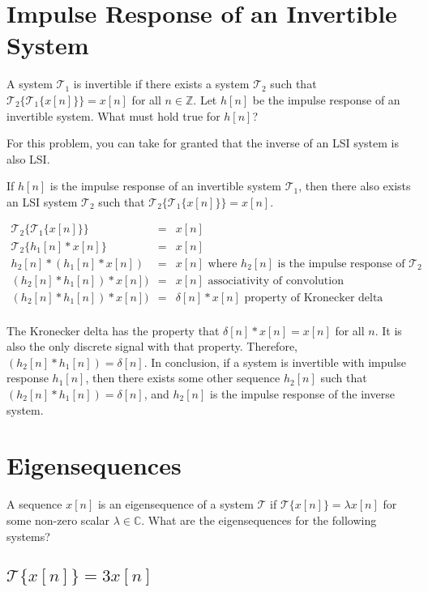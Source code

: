 \documentclass[11pt]{article}
\begin{document}
\section{Impulse Response of an Invertible System}
A system $\mathcal{T}_1$ is invertible if there exists a system $\mathcal{T}_2$ such that $\mathcal{T}_2\{\mathcal{T}_1\{x[n]\}\} = x[n]$ for all $n \in \mathbb{Z}$. Let $h[n]$ be the impulse response of an invertible system. What must hold true for $h[n]$?

{\color{blue}
For this problem, you can take for granted that the inverse of an LSI system is also LSI.

If $h[n]$ is the impulse response of an invertible system $\mathcal{T}_1$, then there also exists an LSI system $\mathcal{T}_2$ such that $\mathcal{T}_2\{\mathcal{T}_1\{x[n]\}\} = x[n]$. 

\begin{eqnarray*}
\mathcal{T}_2\{\mathcal{T}_1\{x[n]\}\} &=& x[n] \\
\mathcal{T}_2\{h_1[n]*x[n]\} &=& x[n] \\
h_2[n]*(h_1[n]*x[n]) &=& x[n] \text{ where $h_2[n]$ is the impulse response of $\mathcal{T_2}$}\\
(h_2[n]*h_1[n])*x[n]) &=& x[n] \text{ associativity of convolution}\\
(h_2[n]*h_1[n])*x[n]) &=& \delta[n]*x[n] \text{ property of Kronecker delta}\\
\end{eqnarray*}

The Kronecker delta has the property that $\delta[n]*x[n]=x[n]$ for all $n$. It is also the only discrete signal with that property. Therefore, $(h_2[n]*h_1[n])=\delta[n]$. In conclusion, if a system is invertible with impulse response $h_1[n]$, then there exists some other sequence $h_2[n]$ such that $(h_2[n]*h_1[n])=\delta[n]$, and $h_2[n]$ is the impulse response of the inverse system.
}

\section{Eigensequences}
A sequence $x[n]$ is an eigensequence of a system $\mathcal{T}$ if $\mathcal{T}\{x[n]\}=\lambda x[n]$ for some non-zero scalar $\lambda \in \mathbb{C}$. What are the eigensequences for the following systems?
\subsection{$\mathcal{T}\{x[n]\}=3x[n]$}
\end{document}
